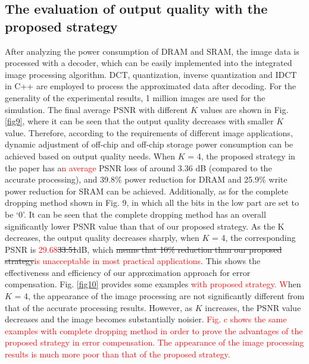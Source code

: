 \documentclass[lettersize,journal]{IEEEtran}
\begin{document}
\subsection{The evaluation of output quality with the proposed strategy}
After analyzing the power consumption of DRAM and SRAM, the image data is processed with a decoder, which can be easily implemented into the integrated image processing algorithm. DCT, quantization, inverse quantization and IDCT in C++ are employed to process the approximated data after decoding. For the generality of the experimental results, 1 million images are used for the simulation. The final average PSNR with different $K$ values are shown in Fig. \ref{fig9}, where it can be seen that the output quality decreases with smaller $K$ value. Therefore, according to the requirements of different image applications, dynamic adjustment of off-chip and off-chip storage power consumption can be achieved based on output quality needs. When $K$ = 4, the proposed strategy in the paper has a\textcolor{red}{n average} PSNR loss of around 3.36 dB (compared to the accurate processing), and 39.8\% power reduction for DRAM and 25.9\% write power reduction for SRAM can be achieved. Additionally, as for the complete dropping method shown in Fig. 9, in which all the bits in the low part are set to be `0'. It can be seen that the complete dropping method has an overall significantly lower PSNR value than that of our proposed strategy. As the K decreases, the output quality decreases sharply, when $K$ = 4, the corresponding PSNR is \textcolor{red}{29.68}{\color{red}\sout{33.51}}dB, which {\color{red}\sout{means that 10\% reduction than our proposed strategy}}\textcolor{red}{is unacceptable in most practical applications}. This shows the effectiveness and efficiency of our approximation approach for error compensation. Fig. \ref{fig10} provides some examples \textcolor{red}{with proposed strategy.} \textcolor{red}{W}hen $K$ = 4, the appearance of the image processing are not significantly different from that of the accurate processing results. However, as $K$ increases, the PSNR value decreases and the image becomes substantially noisier.
\textcolor{red}{Fig. c shows the same examples with complete dropping method in order to prove the advantages of the proposed strategy in error compensation. The appearance of the image processing results is much more poor than that of the proposed strategy.}
\end{document}

